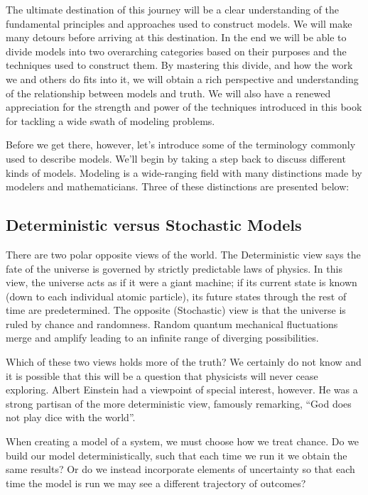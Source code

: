 \documentclass[]{memoir}
\begin{document}
The ultimate destination of this journey will be a clear understanding
of the fundamental principles and approaches used to construct models.
We will make many detours before arriving at this destination. In the
end we will be able to divide models into two overarching categories
based on their purposes and the techniques used to construct them. By
mastering this divide, and how the work we and others do fits into it,
we will obtain a rich perspective and understanding of the relationship
between models and truth. We will also have a renewed appreciation for
the strength and power of the techniques introduced in this book for
tackling a wide swath of modeling problems.

Before we get there, however, let's introduce some of the terminology
commonly used to describe models. We'll begin by taking a step back to
discuss different kinds of models. Modeling is a wide-ranging field with
many distinctions made by modelers and mathematicians. Three of these
distinctions are presented below:

\subsection{Deterministic versus Stochastic Models}

There are two polar opposite views of the world. The Deterministic view
says the fate of the universe is governed by strictly predictable laws
of physics. In this view, the universe acts as if it were a giant
machine; if its current state is known (down to each individual atomic
particle), its future states through the rest of time are predetermined.
The opposite (Stochastic) view is that the universe is ruled by chance
and randomness. Random quantum mechanical fluctuations merge and amplify
leading to an infinite range of diverging possibilities.

Which of these two views holds more of the truth? We certainly do not
know and it is possible that this will be a question that physicists
will never cease exploring. Albert Einstein had a viewpoint of special
interest, however. He was a strong partisan of the more deterministic
view, famously remarking, ``God does not play dice with the world''.

When creating a model of a system, we must choose how we treat chance.
Do we build our model deterministically, such that each time we run it
we obtain the same results? Or do we instead incorporate elements of
uncertainty so that each time the model is run we may see a different
trajectory of outcomes?
\end{document}
